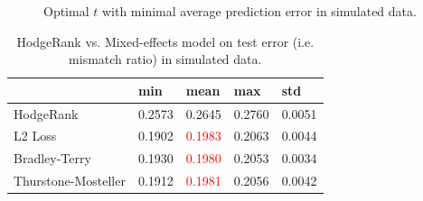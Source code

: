 \documentclass[10pt,journal,cspaper,compsoc]{IEEEtran}
\begin{document}
{\begin{figure}
 \begin{center}
  \caption{Optimal $t$ with minimal average prediction error in simulated data.} \label{simulated3}
\end{center}
\end{figure}

%
%




\begin{table}\caption{\label{simulatedresult} HodgeRank vs. Mixed-effects model on test error (i.e. mismatch ratio) in simulated data.}
\centering
\begin{tabular}{lllll}
 \hline     &min  &mean &max &std\\
 \hline  HodgeRank     &0.2573    &0.2645    &0.2760    &0.0051 \\
\hline  L2 Loss    &0.1902    &\textcolor{red}{0.1983}    &0.2063    &0.0044  \\
\hline Bradley-Terry    &0.1930    &\textcolor{red}{0.1980}    &0.2053    &0.0034 \\
\hline Thurstone-Mosteller    &0.1912    &\textcolor{red}{0.1981}    &0.2056    &0.0042
  \\
 \hline
 \end {tabular}
\end{table}




}
\end{document}

